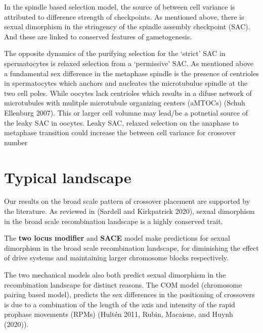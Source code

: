 \documentclass[]{article}
\begin{document}
In the spindle based selection model, the source of between cell
variance is attributed to difference strength of checkpoints. As
mentioned above, there is sexual dimorphism in the stringency of the
spindle assembly checkpoint (SAC). And these are linked to conserved
features of gametogenesis.

The opposite dynamics of the purifying selection for the `strict' SAC in
spermatocytes is relaxed selection from a `permissive' SAC. As mentioned
above a fundamental sex difference in the metaphase spindle is the
presence of centrioles in spermatocytes which anchors and nucleates the
microtubulue spindle at the two cell poles. While oocytes lack
centrioles which results in a difuse network of microtubules with
mulitple microtubule organizing centers (aMTOCs) (Schuh Ellenburg 2007).
This or larger cell volumne may lead/be a potnetial source of the leaky
SAC in oocytes. Leaky SAC, relaxed selection on the anaphase to
metaphase transition could increase the between cell variance for
crossover number

\section{Typical landscape}\label{typical-landscape}

Our results on the broad scale pattern of crossover placement are
supported by the literature. As reviewed in (Sardell and Kirkpatrick
2020), sexual dimorphism in the broad scale recombination landscape is a
highly conserved trait.

The \textbf{two locus modifier} and \textbf{SACE} model make predictions
for sexual dimorphism in the broad scale recombination landscape, for
diminishing the effect of drive systems and maintaining larger
chromosome blocks respectively.

The two mechanical models also both predict sexual dimorphism in the
recombination landscape for distinct reasons. The COM model (chromosome
pairing based model), predicts the sex differences in the positioning of
crossovers is due to a combination of the length of the axis and
intensity of the rapid prophase movements (RPMs) (Hultén 2011, Rubin,
Macaisne, and Huynh (2020)).
\end{document}
